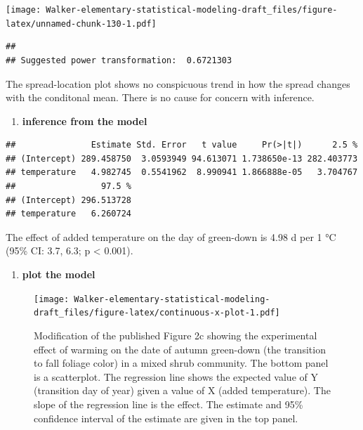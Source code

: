 \documentclass[]{book}
\newenvironment{Shaded}{\begin{snugshade}}{\end{snugshade}}
\newcommand{\KeywordTok}[1]{\textcolor[rgb]{0.13,0.29,0.53}{\textbf{#1}}}
\newcommand{\NormalTok}[1]{#1}
\newcommand{\OperatorTok}[1]{\textcolor[rgb]{0.81,0.36,0.00}{\textbf{#1}}}
\newcommand{\StringTok}[1]{\textcolor[rgb]{0.31,0.60,0.02}{#1}}
\providecommand{\tightlist}{%
  \setlength{\itemsep}{0pt}\setlength{\parskip}{0pt}}
\begin{document}
\texttt{[image: Walker-elementary-statistical-modeling-draft\_files/figure-latex/unnamed-chunk-130-1.pdf]}

\begin{verbatim}
## 
## Suggested power transformation:  0.6721303
\end{verbatim}

The spread-location plot shows no conspicuous trend in how the spread changes with the conditonal mean. There is no cause for concern with inference.

\begin{enumerate}
\def\labelenumi{\arabic{enumi}.}
\setcounter{enumi}{4}
\tightlist
\item
  \textbf{inference from the model}
\end{enumerate}

\begin{Shaded}
\end{Shaded}

\begin{verbatim}
##               Estimate Std. Error   t value     Pr(>|t|)      2.5 %
## (Intercept) 289.458750  3.0593949 94.613071 1.738650e-13 282.403773
## temperature   4.982745  0.5541962  8.990941 1.866888e-05   3.704767
##                 97.5 %
## (Intercept) 296.513728
## temperature   6.260724
\end{verbatim}

The effect of added temperature on the day of green-down is 4.98 d per 1 °C (95\% CI: 3.7, 6.3; p \textless{} 0.001).

\begin{enumerate}
\def\labelenumi{\arabic{enumi}.}
\setcounter{enumi}{5}
\tightlist
\item
  \textbf{plot the model}
\end{enumerate}

\begin{figure}
\centering
\texttt{[image: Walker-elementary-statistical-modeling-draft\_files/figure-latex/continuous-x-plot-1.pdf]}
\caption{\label{fig:continuous-x-plot}Modification of the published Figure 2c showing the experimental effect of warming on the date of autumn green-down (the transition to fall foliage color) in a mixed shrub community. The bottom panel is a scatterplot. The regression line shows the expected value of Y (transition day of year) given a value of X (added temperature). The slope of the regression line is the effect. The estimate and 95\% confidence interval of the estimate are given in the top panel.}
\end{figure}
\end{document}
